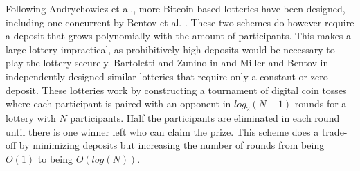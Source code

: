 Following Andrychowicz et al., more Bitcoin based lotteries have been designed, including one concurrent by Bentov et al. \cite{bentov_how_2014}. These two schemes do however require a deposit that grows polynomially with the amount of participants. This makes a large lottery impractical, as prohibitively high deposits would be necessary to play the lottery securely. Bartoletti and Zunino in \cite{bartoletti_constant-deposit_2017} and Miller and Bentov in \cite{miller_zero-collateral_2017} independently designed similar lotteries that require only a constant or zero deposit. These lotteries work by constructing a tournament of digital coin tosses where each participant is paired with an opponent in $log_2(N-1)$ rounds for a lottery with $N$ participants. Half the participants are eliminated in each round until there is one winner left who can claim the prize. This scheme does a trade-off by minimizing deposits but increasing the number of rounds from being $O(1)$ to being $O(log(N))$. 
